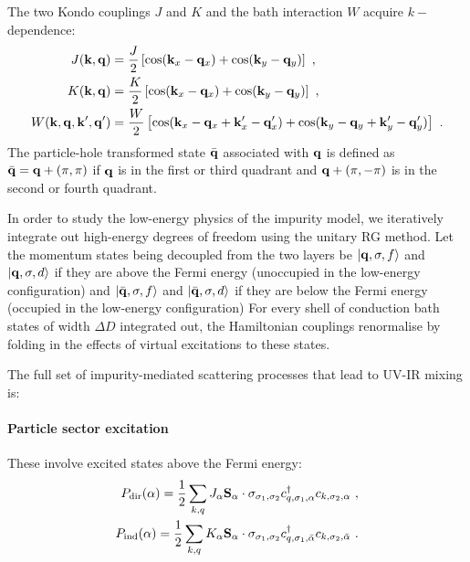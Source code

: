 The two Kondo couplings \(J\) and \(K\) and the bath interaction \(W\) acquire \(k-\)dependence:
\begin{equation}\begin{aligned}
	J({\bf k}, {\bf q}) &= \frac{J}{2}\left[\cos({\bf k}_x - {\bf q}_x) + \cos({\bf k}_y - {\bf q}_y)\right]~,\\
	K({\bf k}, {\bf q}) &= \frac{K}{2}\left[\cos({\bf k}_x - {\bf q}_x) + \cos({\bf k}_y - {\bf q}_y)\right]~,\\
	W({\bf k}, {\bf q}, {\bf k}^\prime, {\bf q}^\prime) &= \frac{W}{2}\left[\cos({\bf k}_x - {\bf q}_x + {\bf k}^\prime_x - {\bf q}^\prime_x) + \cos({\bf k}_y - {\bf q}_y + {\bf k}^\prime_y - {\bf q}^\prime_y)\right]~.
\end{aligned}\end{equation}
The particle-hole transformed state \(\bar{\bf q}\) associated with \({\bf q}\) is defined as \(\bar {\bf q} = {\bf q} + \left(\pi, \pi\right)\) if \({\bf q}\) is in the first or third quadrant and \({\bf q} + \left(\pi, -\pi\right)\) is in the second or fourth quadrant.

In order to study the low-energy physics of the impurity model, we iteratively integrate out high-energy degrees of freedom using the unitary RG method. Let the momentum states being decoupled from the two layers be \(\ket{{\bf q},\sigma,f}\) and \(\ket{{\bf q},\sigma,d}\) if they are above the Fermi energy (unoccupied in the low-energy configuration) and \(\ket{\bar{\bf q},\sigma,f}\) and \(\ket{\bar{\bf q},\sigma,d}\) if they are below the Fermi energy (occupied in the low-energy configuration)
For every shell of conduction bath states of width \(\Delta D\) integrated out, the Hamiltonian couplings renormalise by folding in the effects of virtual excitations to these states. 

The full set of impurity-mediated scattering processes that lead to UV-IR mixing is:
\paragraph{Particle sector excitation}
These involve excited states above the Fermi energy:
\begin{equation}\begin{aligned}
	P_\text{dir}(\alpha) = \frac{1}{2}\sum_{k, q} J_\alpha {\bf S}_\alpha \cdot {\bf \sigma}_{\sigma_1,\sigma_2} c^\dagger_{q,\sigma_1, \alpha}c_{k,\sigma_2, \alpha}~,\\
	P_\text{ind}(\alpha) = \frac{1}{2}\sum_{k, q} K_{\alpha} {\bf S}_{\alpha} \cdot {\bf \sigma}_{\sigma_1,\sigma_2} c^\dagger_{q,\sigma_1, \bar\alpha}c_{k,\sigma_2, \bar\alpha}~.
\end{aligned}\end{equation}

